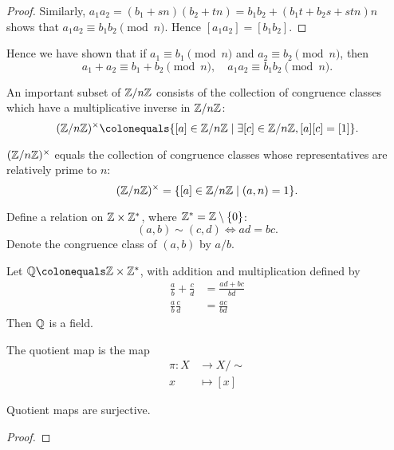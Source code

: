 \begin{example}
\begin{proof}
Similarly, $a_1a_2=(b_1+sn)(b_2+tn)=b_1b_2+(b_1t+b_2s+stn)n$ shows that $a_1a_2\equiv b_1b_2\pmod n$. Hence $[a_1a_2]=[b_1b_2]$.
\end{proof}

Hence we have shown that if $a_1\equiv b_1\pmod n$ and $a_2\equiv b_2\pmod n$, then
\[a_1+a_2\equiv b_1+b_2\pmod n,\quad a_1a_2\equiv b_1b_2\pmod n.\]

An important subset of $\mathbb Z/n\mathbb Z$ consists of the collection of congruence classes which have a multiplicative inverse in $\mathbb Z/n\mathbb Z$:
\[(\ZZ/n\ZZ)^\times\colonequals\{[a]\in\ZZ/n\ZZ\mid\exists[c]\in\ZZ/n\ZZ,[a][c]=[1]\}.\]

\begin{lemma*}
$(\mathbb Z/n\mathbb Z)^\times$ equals the collection of congruence classes whose representatives are relatively prime to $n$:
\[(\mathbb Z/n\mathbb Z)^\times=\{[a]\in\mathbb Z/n\mathbb Z\mid(a,n)=1\}.\]
\end{lemma*}
\end{example}

\begin{example}[Rationals]
Define a relation on $\mathbb Z\times\mathbb Z^*$, where $\mathbb Z^*=\mathbb Z\setminus\{0\}$:
\[(a,b)\sim(c,d)\iff ad=bc.\]
Denote the congruence class of $(a,b)$ by $a/b$.

Let $\QQ\colonequals\ZZ\times\ZZ^*$, with addition and multiplication defined by
\begin{align*}
\frac{a}{b}+\frac{c}{d}&=\frac{ad+bc}{bd}\\
\frac{a}{b}\frac{c}{d}&=\frac{ac}{bd}
\end{align*}
Then $\mathbb Q$ is a field.
\end{example}

\begin{definition}
The quotient map is the map
\begin{align*}
\pi\colon X&\to X/\sim\\
x&\mapsto[x]
\end{align*}
\end{definition}

\begin{lemma}
Quotient maps are surjective.
\end{lemma}

\begin{proof}

\end{proof}

